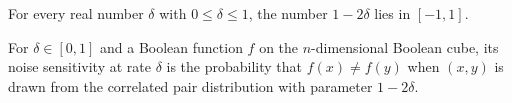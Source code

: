\begin{theorem}
\label{FABL.one_sub_two_mul_mem_Icc}
\leanok
{}
For every real number $\delta$ with $0\leq\delta\leq1$, the number $1-2\delta$ lies in
$[-1,1]$.
\end{theorem}

\begin{definition}
\label{FABL.noiseSensitivity}
\leanok
{}
For $\delta\in[0,1]$ and a Boolean function $f$ on the $n$-dimensional Boolean cube, its
noise sensitivity at rate $\delta$ is the probability that $f(x)\ne f(y)$ when $(x,y)$
is drawn from the correlated pair distribution with parameter $1-2\delta$.
\end{definition}

